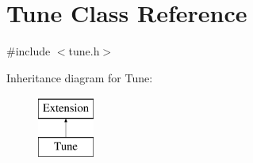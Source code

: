 \hypertarget{classTune}{
\section{Tune Class Reference}
\label{classTune}
}


{\ttfamily \#include $<$tune.h$>$}

Inheritance diagram for Tune:\begin{figure}[H]
\begin{center}
\leavevmode
\includegraphics[height=2.000000cm]{classTune}
\end{center}
\end{figure}
